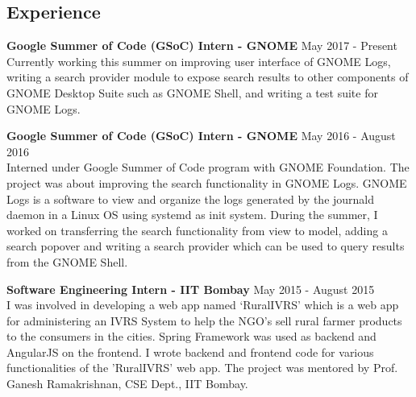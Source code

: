 \documentclass[12pt,margin, centered]{res}
\begin{document}
\begin{resume}



\section{Experience}
\vspace{10mm}

\textbf{Google Summer of Code (GSoC) Intern - GNOME} \hfill May 2017 - Present\\
Currently working this summer on improving user interface of GNOME Logs, writing a search provider module to expose search results to other components of GNOME Desktop Suite such as GNOME Shell, and writing a test suite for GNOME Logs.

\vspace{2mm}

\textbf{Google Summer of Code (GSoC) Intern - GNOME} \hfill May 2016 - August 2016\\
Interned under Google Summer of Code program with GNOME Foundation. The project was about improving the search functionality in GNOME Logs. GNOME Logs is a software to view and organize the logs generated by the journald daemon in a Linux OS using systemd as init system. During the summer, I worked on transferring the search functionality from view to model, adding a search popover and writing a search provider which can be used to query results from the GNOME Shell.

\vspace{2mm}

\textbf{Software Engineering Intern - IIT Bombay} \hfill May 2015 - August 2015\\
I was involved in developing a web app named ‘RuralIVRS’ which is a web app for administering an IVRS System to help the NGO's sell rural farmer products to the consumers in the cities. Spring Framework was used as backend and AngularJS on the frontend. I wrote backend and frontend code for various functionalities of the 'RuralIVRS' web app. The project was mentored by Prof. Ganesh Ramakrishnan, CSE Dept., IIT Bombay.




\end{resume}
\end{document}
